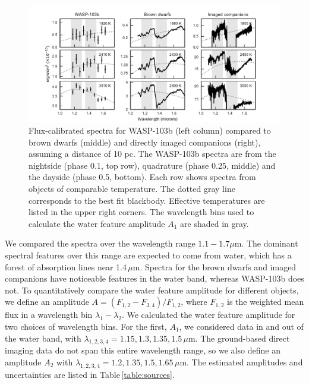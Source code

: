 \documentclass[twocolumn]{aastex61}
\begin{document}
\begin{figure}
\includegraphics[width = 1.0\textwidth]{Figures/spectra_comparison.pdf}
\caption{Flux-calibrated spectra for WASP-103b (left column) compared to brown dwarfs (middle) and directly imaged companions (right), assuming a distance of 10 pc. The WASP-103b spectra are from the nightside (phase 0.1, top row), quadrature (phase 0.25, middle) and the dayside (phase 0.5, bottom). Each row shows spectra from objects of comparable temperature. The dotted gray line corresponds to the best fit blackbody. Effective temperatures are listed in the upper right corners. The wavelength bins used to calculate the water feature amplitude $A_1$ are shaded in gray.}
\label{fig:planetstarcomparison}
\end{figure}

We compared the spectra over the wavelength range $1.1 - 1.7\mu$m. The dominant spectral features over this range are expected to come from water, which has a forest of absorption lines near 1.4\,$\mu$m. Spectra for the brown dwarfs and imaged companions have noticeable features in the water band, whereas WASP-103b does not. To quantitatively compare the water feature amplitude for different objects, we define an amplitude $A = (F_{1,2} - F_{3,4})/F_{1,2}$, where $F_{1,2}$ is the weighted mean flux in a wavelength bin $\lambda_1 - \lambda_2$. We calculated the water feature amplitude for two choices of wavelength bins. For the first, $A_1$, we considered data in and out of the water band, with $\lambda_{1,2,3,4} = 1.15, 1.3, 1.35, 1.5\,\mu$m. The ground-based direct imaging data do not span this entire wavelength range, so we also define an amplitude $A_2$ with $\lambda_{1,2,3,4} = 1.2, 1.35, 1.5, 1.65\,\mu$m. The estimated amplitudes and uncertainties are listed in Table\,\ref{table:sources}.
 
\end{document}
